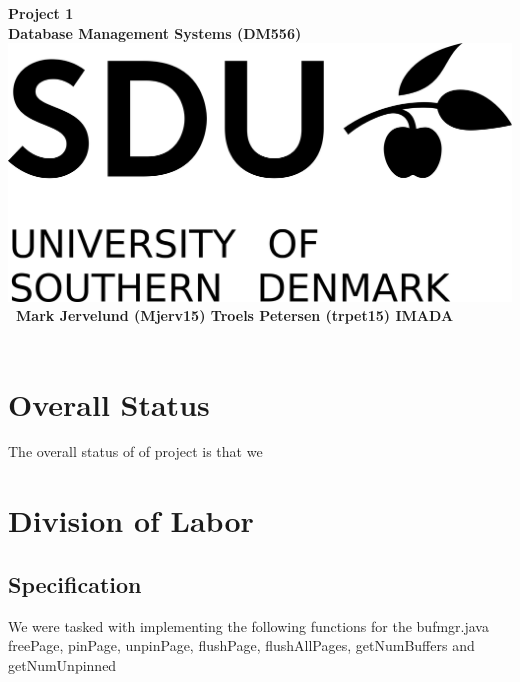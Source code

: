 \documentclass[a4paper,10pt,titlepage]{report}
\date{}
\begin{document}
\begin{titlepage}
\centering
    \vspace*{9\baselineskip}
    \huge
    \bfseries
    Project 1\\
    
    \normalfont 
	\huge    
    Database Management Systems (DM556)  \\[4\baselineskip]
    \normalfont
	\includegraphics[scale=1.5]{SDU_Logo}
    \vfill\ 
    Mark Jervelund (Mjerv15) Troels Petersen (trpet15)
    \vspace{5mm}
    IMADA \\
    \textbf{\datedate} \\[2\baselineskip]
\end{titlepage}

\setcounter{page}{1}
\renewcommand{\thepage}{\arabic{page}}

\lstset{language=Java}          %
\section{Overall Status}
The overall status of of project is that we 
\section{Division of Labor}
\subsection{Specification}
We were tasked with implementing the following functions for the bufmgr.java\\

freePage, pinPage, unpinPage, flushPage, flushAllPages, getNumBuffers and getNumUnpinned \\
\end{document}
